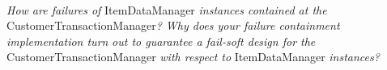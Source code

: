 \documentclass[paper=a4, fontsize=11pt]{scrartcl} %
\numberwithin{equation}{section} %
\numberwithin{figure}{section} %
\numberwithin{table}{section} %
\begin{document}
~\\
\textit{How are failures of }ItemDataManager\textit{ instances contained at the}
CustomerTransactionManager\textit{? Why does your failure containment implementation turn}
\textit{out to guarantee a fail-soft design for the }CustomerTransactionManager\textit{ with respect to}
ItemDataManager\textit{ instances?}\\
~\\
\end{document}
